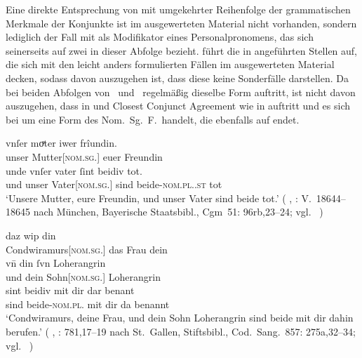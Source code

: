 Eine direkte Entsprechung von  mit umgekehrter Reihenfolge der
grammatischen Merkmale der Konjunkte ist im ausgewerteten Material nicht
vorhanden, sondern lediglich der Fall mit  als Modifikator eines
Personalpronomens, das sich seinerseits auf zwei  in dieser
Abfolge bezieht. \citet[96, 145]{askedal1973} führt die in
 angeführten Stellen auf, die sich mit den leicht anders
formulierten Fällen im ausgewerteten Material decken, sodass davon auszugehen
ist, dass diese keine Sonderfälle darstellen. Da bei beiden Abfolgen von
\MascM\ und \FemF\ regelmäßig dieselbe Form  auftritt, ist nicht
davon auszugehen, dass in  und  Closest
Conjunct Agreement wie in  auftritt
und es sich bei  um eine Form des Nom.~Sg.~F.\ handelt, die
ebenfalls auf  endet.

\begin{exe}
	\ex \label{ex:askfmbeidiu}
		\begin{xlist}
		\ex \gll vnſer moͮter iwer frîundin. \\
				unser Mutter[\textsc{nom.sg.\FemF}] euer Freundin \\
		\sn \gll unde vnſer vater ſint beidiv tot. \\
				und unser Vater[\textsc{nom.sg.\MascM}] sind
				beide-\textsc{nom.pl.\NeutMF.st} tot \\
			\trans `Unsere Mutter, eure Freundin, und unser Vater sind beide
				tot.'
				(%
					, : V.~18644--18645
					nach München, Bayerische Staatsbibl., Cgm~51: 96rb,23--24;
					vgl.~\cite[259]{maroldschroeder1969}%
				)
			\label{ex:askfmbeidiu_1}
	
		\ex {} daz wip din \\
				Condwiramurs[\textsc{nom.sg.\FemF}] das Frau dein \\
		\sn \gll vn̄ din ſvn Loherangrin \\
				und dein Sohn[\textsc{nom.sg.\MascM}] Loherangrin \\
		\sn \gll sint beidiv mit dir dar benant \\
				sind beide-\textsc{nom.pl.\NeutMF} mit dir da benannt \\
		\trans `Condwiramurs, deine Frau, und dein Sohn Loherangrin
			sind beide mit dir dahin berufen.'
			(%
				, : 781,17--19
				nach St.~Gallen, Stiftsbibl., Cod.~Sang.~857: 275a,32--34;
				vgl.~\cite[785]{knechtschirok2003}%
			)
			\label{ex:askfmbeidiu_2}
	\end{xlist}
\end{exe}


